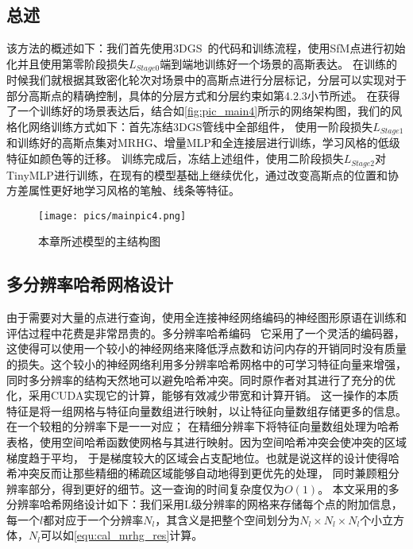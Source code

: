 \subsection{总述}
该方法的概述如下：我们首先使用3DGS~\cite{kerbl20233d}的代码和训练流程，使用SfM点进行初始化并且使用第零阶段损失\(L_{Stage0}\)端到端地训练好一个场景的高斯表达。
在训练的时候我们就根据其致密化轮次对场景中的高斯点进行分层标记，分层可以实现对于部分高斯点的精确控制，具体的分层方式和分层约束如第4.2.3小节所述。
在获得了一个训练好的场景表达后，结合如\autoref{fig:pic_main4}所示的网络架构图，我们的风格化网络训练方式如下：首先冻结3DGS管线中全部组件，
使用一阶段损失\(L_{Stage1}\)和训练好的高斯点集对MRHG、增量MLP和全连接层进行训练，学习风格的低级特征如颜色等的迁移。
训练完成后，冻结上述组件，使用二阶段损失\(L_{Stage2}\)对TinyMLP进行训练，在现有的模型基础上继续优化，通过改变高斯点的位置和协方差属性更好地学习风格的笔触、线条等特征。

\begin{figure}[htb]
    \centering
    \texttt{[image: pics/mainpic4.png]}
    \caption{\label{fig:pic_main4}本章所述模型的主结构图}
\end{figure}
\subsection{多分辨率哈希网格设计}
由于需要对大量的点进行查询，使用全连接神经网络编码的神经图形原语在训练和评估过程中花费是非常昂贵的。多分辨率哈希编码~\cite{muller2022instant}
它采用了一个灵活的编码器，这使得可以使用一个较小的神经网络来降低浮点数和访问内存的开销同时没有质量的损失。这个较小的神经网络利用多分辨率哈希网格中的可学习特征向量来增强，
同时多分辨率的结构天然地可以避免哈希冲突。同时原作者对其进行了充分的优化，采用CUDA实现它的计算，能够有效减少带宽和计算开销。
这一操作的本质特征是将一组网格与特征向量数组进行映射，以让特征向量数组存储更多的信息。在一个较粗的分辨率下是一一对应；
在精细分辨率下将特征向量数组处理为哈希表格，使用空间哈希函数使网格与其进行映射。因为空间哈希冲突会使冲突的区域梯度趋于平均，
于是梯度较大的区域会占支配地位。也就是说这样的设计使得哈希冲突反而让那些精细的稀疏区域能够自动地得到更优先的处理，
同时兼顾粗分辨率部分，得到更好的细节。这一查询的时间复杂度仅为\(O(1)\)。
本文采用的多分辨率哈希网络设计如下：我们采用L级分辨率的网格来存储每个点的附加信息，
每一个$l$都对应于一个分辨率\(N_l\)，其含义是把整个空间划分为\(N_l\times N_l\times N_l\)个小立方体，\(N_l\)可以如\autoref{equ:cal_mrhg_res}计算。

